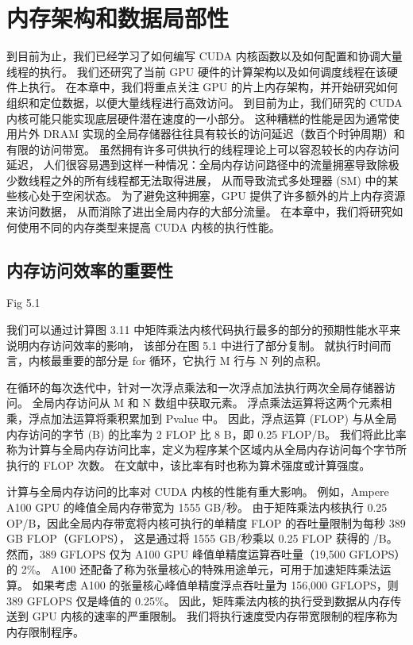 \section{内存架构和数据局部性}
到目前为止，我们已经学习了如何编写 CUDA 内核函数以及如何配置和协调大量线程的执行。 
我们还研究了当前 GPU 硬件的计算架构以及如何调度线程在该硬件上执行。 
在本章中，我们将重点关注 GPU 的片上内存架构，并开始研究如何组织和定位数据，以便大量线程进行高效访问。 
到目前为止，我们研究的 CUDA 内核可能只能实现底层硬件潜在速度的一小部分。 
这种糟糕的性能是因为通常使用片外 DRAM 实现的全局存储器往往具有较长的访问延迟（数百个时钟周期）和有限的访问带宽。 
虽然拥有许多可供执行的线程理论上可以容忍较长的内存访问延迟，
人们很容易遇到这样一种情况：全局内存访问路径中的流量拥塞导致除极少数线程之外的所有线程都无法取得进展，
从而导致流式多处理器 (SM) 中的某些核心处于空闲状态。 为了避免这种拥塞，GPU 提供了许多额外的片上内存资源来访问数据，
从而消除了进出全局内存的大部分流量。 在本章中，我们将研究如何使用不同的内存类型来提高 CUDA 内核的执行性能。

\subsection{内存访问效率的重要性}
{\color{red} Fig 5.1}

我们可以通过计算图 3.11 中矩阵乘法内核代码执行最多的部分的预期性能水平来说明内存访问效率的影响，
该部分在图 5.1 中进行了部分复制。 就执行时间而言，内核最重要的部分是 for 循环，它执行 M 行与 N 列的点积。

在循环的每次迭代中，针对一次浮点乘法和一次浮点加法执行两次全局存储器访问。 全局内存访问从 M 和 N 数组中获取元素。 
浮点乘法运算将这两个元素相乘，浮点加法运算将乘积累加到 Pvalue 中。 
因此，浮点运算 (FLOP) 与从全局内存访问的字节 (B) 的比率为 2 FLOP 比 8 B，即 0.25 FLOP/B。 
我们将此比率称为计算与全局内存访问比率，定义为程序某个区域内从全局内存访问每个字节所执行的 FLOP 次数。 
在文献中，该比率有时也称为算术强度或计算强度。

计算与全局内存访问的比率对 CUDA 内核的性能有重大影响。 例如，Ampere A100 GPU 的峰值全局内存带宽为 1555 GB/秒。 
由于矩阵乘法内核执行 0.25 OP/B，因此全局内存带宽将内核可执行的单精度 FLOP 的吞吐量限制为每秒 389 GB FLOP（GFLOPS），
这是通过将 1555 GB/秒乘以 0.25 FLOP 获得的 /B。 
然而，389 GFLOPS 仅为 A100 GPU 峰值单精度运算吞吐量（19,500 GFLOPS）的 2\%。 
A100 还配备了称为张量核心的特殊用途单元，可用于加速矩阵乘法运算。 
如果考虑 A100 的张量核心峰值单精度浮点吞吐量为 156,000 GFLOPS，则 389 GFLOPS 仅是峰值的 0.25\%。 
因此，矩阵乘法内核的执行受到数据从内存传送到 GPU 内核的速率的严重限制。 
我们将执行速度受内存带宽限制的程序称为内存限制程序。

